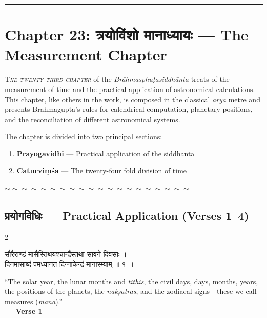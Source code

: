 \documentclass[11pt,a4paper]{article}
\newcommand{\dev}[1]{{\devanagarifont #1}}
\newenvironment{bilingualverse}{%
  \begin{paracol}{2}
  \fontsize{10.5}{13}\selectfont
}{%
  \end{paracol}
  \vspace{0.3cm}
}
\newcommand{\divider}{\begin{center}\textcolor{dividercolor}{\rule{0.5\textwidth}{0.5pt}}\end{center}}
\newcommand{\wavydivider}{\begin{center}$\sim\sim\sim\sim\sim\sim\sim\sim\sim\sim\sim\sim\sim\sim\sim\sim\sim\sim\sim\sim$\end{center}}
\begin{document}
\divider
\newpage

\section*{Chapter 23: \dev{त्रयोविंशो मानाध्यायः} — The Measurement Chapter}

\lettrine[lines=3,loversize=0.1]{T}{\textit{he twenty-third chapter}} of the \textit{Brāhmasphuṭasiddhānta} treats of the measurement of time and the practical application of astronomical calculations. This chapter, like others in the work, is composed in the classical \textit{āryā} metre and presents Brahmagupta's rules for calendrical computation, planetary positions, and the reconciliation of different astronomical systems.

The chapter is divided into two principal sections:
\begin{enumerate}[label=(\roman*),leftmargin=2em]
  \item \textbf{Prayogavidhi} — Practical application of the siddhānta
  \item \textbf{Caturviṃśa} — The twenty-four fold division of time
\end{enumerate}

\wavydivider

\subsection*{\dev{प्रयोगविधिः} — Practical Application (Verses 1--4)}

\begin{bilingualverse}
\begin{leftcolumn*}
\dev{सौरैराण्डं मासैस्तिथयश्चान्द्रैंस्तथा सावने दिवसाः ।}\\
\dev{दिनमासाब्दं पमध्यानत दिग्नाकेन्द्रं मानास्म्याम् ॥ १ ॥}
\end{leftcolumn*}
\begin{rightcolumn}
``The solar year, the lunar months and \textit{tithis}, the civil days, days, months, years, the positions of the planets, the \textit{nakṣatras}, and the zodiacal signs---these we call measures (\textit{māna}).''\\[0.3cm]
\hfill\textbf{— Verse 1}
\end{rightcolumn}
\end{bilingualverse}
\end{document}
